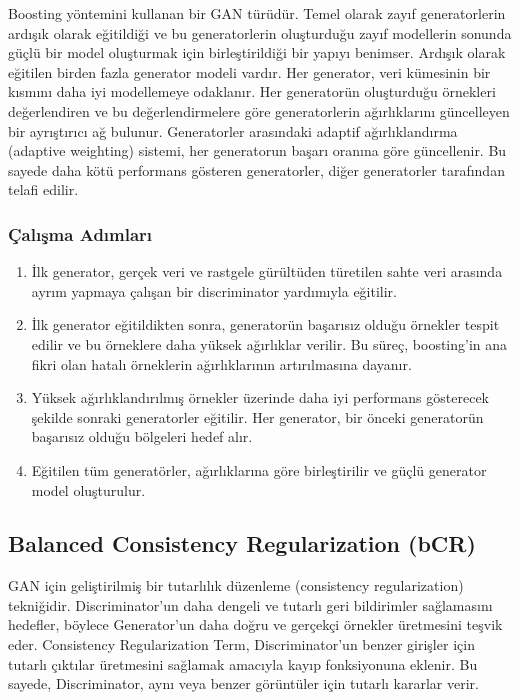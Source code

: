 Boosting yöntemini kullanan bir GAN türüdür. Temel olarak zayıf generatorlerin ardışık olarak eğitildiği ve bu generatorlerin oluşturduğu zayıf modellerin sonunda güçlü bir model oluşturmak için birleştirildiği bir yapıyı benimser. Ardışık olarak eğitilen birden fazla generator modeli vardır. Her generator, veri kümesinin bir kısmını daha iyi modellemeye odaklanır. Her generatorün oluşturduğu örnekleri değerlendiren ve bu değerlendirmelere göre generatorlerin ağırlıklarını güncelleyen bir ayrıştırıcı ağ bulunur. Generatorler arasındaki adaptif ağırlıklandırma (adaptive weighting) sistemi, her generatorun başarı oranına göre güncellenir. Bu sayede daha kötü performans gösteren generatorler, diğer generatorler tarafından telafi edilir. 

\subsubsection{Çalışma Adımları}

\begin{enumerate}
    \item İlk generator, gerçek veri ve rastgele gürültüden türetilen sahte veri arasında ayrım yapmaya çalışan bir discriminator yardımıyla eğitilir.
    \item İlk generator eğitildikten sonra, generatorün başarısız olduğu örnekler tespit edilir ve bu örneklere daha yüksek ağırlıklar verilir. Bu süreç, boosting'in ana fikri olan hatalı örneklerin ağırlıklarının artırılmasına dayanır.
    \item Yüksek ağırlıklandırılmış örnekler üzerinde daha iyi performans gösterecek şekilde sonraki generatorler eğitilir. Her generator, bir önceki generatorün başarısız olduğu bölgeleri hedef alır.
    \item Eğitilen tüm generatörler, ağırlıklarına göre birleştirilir ve güçlü generator model oluşturulur.
\end{enumerate}

\newpage

\subsection{Balanced Consistency Regularization (bCR)}

GAN için geliştirilmiş bir tutarlılık düzenleme (consistency regularization) tekniğidir. Discriminator'un daha dengeli ve tutarlı geri bildirimler sağlamasını hedefler, böylece Generator'un daha doğru ve gerçekçi örnekler üretmesini teşvik eder. Consistency Regularization Term, Discriminator'un benzer girişler için tutarlı çıktılar üretmesini sağlamak amacıyla kayıp fonksiyonuna eklenir. Bu sayede, Discriminator, aynı veya benzer görüntüler için tutarlı kararlar verir.  

